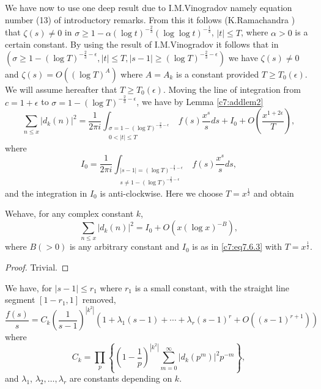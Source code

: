 We have now to use one deep result due to I.M.\@ Vinogradov namely
equation number (13) of introductory remarks. From this it follows
(K.\@ Ramachandra \cite{Ramachandra2}) that $\zeta(s)\neq 0$ in $\sigma\geq
1-\alpha(\log t)^{-\frac{2}{3}}(\log\log t)^{-\frac{1}{3}}$, $|t|\leq
T$, where $\alpha>0$ is a certain constant. By using the result of
I.M.\@ Vinogradov it follows that in $(\sigma\geq 1-(\log
T)^{-\frac{2}{3}-\epsilon},|t|\leq T,|s-1|\geq (\log
T)^{-\frac{2}{3}-\epsilon})$ we have $\zeta(s)\neq 0$ and
$\zeta(s)=O((\log T)^{A})$ where $A=A_{k}$ is a constant provided
$T\geq T_{0}(\epsilon)$. We will assume hereafter that $T\geq
T_{0}(\epsilon)$. Moving the line of integration from $c=1+\epsilon$
to $\sigma=1-(\log T)^{-\frac{2}{3}-\epsilon}$, we have by Lemma
\ref{c7:addlem2} 
\begin{equation*}
\sum_{n\leq x}|d_{k}(n)|^{2}=\frac{1}{2\pi
  i}\int_{\substack{\sigma=1-(\log
    T)^{-\frac{2}{3}-\epsilon}\\ 0<|t|\leq
    T}}f(s)\frac{x^{s}}{s}ds+I_{0}+O\left(\frac{x^{1+2\epsilon}}{T}\right),\tag{7.6.2}\label{c7:eq7.6.2} 
\end{equation*}
where
\begin{equation*}
I_{0}=\frac{1}{2\pi i}\int_{\substack{|s-1|=(\log
    T)^{-\frac{2}{3}-\epsilon}\\ s\neq 1-(\log T)^{-\frac{2}{3}-\epsilon}}}f(s)\frac{x^{s}}{s}ds,\tag{7.6.3}\label{c7:eq7.6.3}
\end{equation*}
and the integration in $I_{0}$ is anti-clockwise. Here we choose
$T=x^{\frac{1}{2}}$ and obtain 

\begin{lem}\label{c7:addlem4}
We\pageoriginale have, for any complex constant $k$,
\begin{equation*}
\sum_{n\leq x}|d_{k}(n)|^{2}=I_{0}+O(x(\log
x)^{-B}),\tag{7.6.4}\label{c7:eq7.6.4} 
\end{equation*}
where $B(>0)$ is any arbitrary constant and $I_{0}$ is as in
\eqref{c7:eq7.6.3} with $T=x^{\frac{1}{2}}$. 
\end{lem}

\begin{proof}
Trivial.
\end{proof}

\begin{lem}\label{c7:addlem5}
We have, for $|s-1|\leq r_{1}$ where $r_{1}$ is a small constant, with
the straight line segment $[1-r_{1},1]$ removed,
$$
\frac{f(s)}{s}=C_{k}\left(\frac{1}{s-1}\right)^{|k^{2}|}(1+\lambda_{1}(s-1)+\cdots+\lambda_{r}(s-1)^{r}+O((s-1)^{r+1}))
$$
where
$$
C_{k}=\prod_{p}\left\{\left(1-\frac{1}{p}\right)^{|k^{2}|}\sum^{\infty}_{m=0}|d_{k}(p^{m})|^{2}p^{-m}\right\},
$$
and $\lambda_{1}$, $\lambda_{2},\ldots,\lambda_{r}$ are constants
depending on $k$.
\end{lem}

